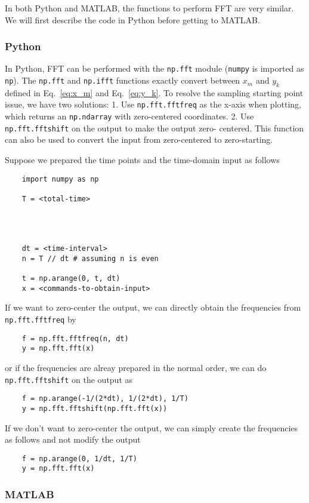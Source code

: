 \documentclass{revtex4-2}
\begin{document}
In both Python and MATLAB, the functions to perform FFT are very similar. We will first describe
the code in Python before getting to MATLAB.

\subsubsection{Python}

In Python, FFT can be performed with the {\tt np.fft} module ({\tt numpy} is imported as {\tt np}).
The {\tt np.fft} and {\tt np.ifft} functions exactly convert between $x_m$ and $y_k$ defined in
Eq.~\ref{eq:x_m} and Eq.~\ref{eq:y_k}. To resolve the sampling starting point issue, we have two
solutions: 1. Use {\tt np.fft.fftfreq} as the x-axis when plotting, which returns an {\tt np.ndarray}
with zero-centered coordinates. 2. Use {\tt np.fft.fftshift} on the output to make the output zero-
centered. This function can also be used to convert the input from zero-centered to zero-starting.

Suppose we prepared the time points and the time-domain input as follows
\begin{verbatim}
    import numpy as np

    T = <total-time>



    
    dt = <time-interval>
    n = T // dt # assuming n is even

    t = np.arange(0, t, dt)
    x = <commands-to-obtain-input>
\end{verbatim}

If we want to zero-center the output, we can directly obtain the frequencies from {\tt np.fft.fftfreq} by
\begin{verbatim}
    f = np.fft.fftfreq(n, dt)
    y = np.fft.fft(x)
\end{verbatim}
or if the frequencies are alreay prepared in the normal order, we can do {\tt np.fft.fftshift} on the
output as
\begin{verbatim}
    f = np.arange(-1/(2*dt), 1/(2*dt), 1/T)
    y = np.fft.fftshift(np.fft.fft(x))
\end{verbatim}

If we don't want to zero-center the output, we can simply create the frequencies as follows and not modify
the output
\begin{verbatim}
    f = np.arange(0, 1/dt, 1/T)
    y = np.fft.fft(x)
\end{verbatim}

\subsubsection{MATLAB}
\end{document}
